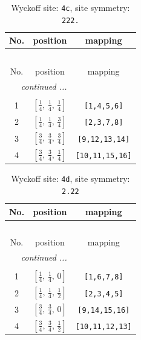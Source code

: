\documentclass[fleqn,8pt]{jsarticle}
\begin{document}
\renewcommand{\arraystretch}{1.2}
\begin{longtable}{ccc}
\caption{Wyckoff site: {\tt 4c}, site symmetry: {\tt 222.}}
 \\
 \hline \hline
No. & position & mapping \\ \hline \endfirsthead

\multicolumn{2}{l}{\tablename\ \thetable{}} \\
 \hline \hline
No. & position & mapping \\ \hline \endhead

 \hline \hline
\multicolumn{2}{r}{\footnotesize\it continued ...} \\ \endfoot

 \hline \hline
\multicolumn{2}{r}{} \\ \endlastfoot

1 & $\left[ \frac{1}{4},\, \frac{1}{4},\, \frac{1}{4} \right]$ & {\tt [1,4,5,6]} \\ \hline
2 & $\left[ \frac{1}{4},\, \frac{1}{4},\, \frac{3}{4} \right]$ & {\tt [2,3,7,8]} \\ \hline
3 & $\left[ \frac{3}{4},\, \frac{3}{4},\, \frac{3}{4} \right]$ & {\tt [9,12,13,14]} \\ \hline
4 & $\left[ \frac{3}{4},\, \frac{3}{4},\, \frac{1}{4} \right]$ & {\tt [10,11,15,16]} \\
\end{longtable}
\renewcommand{\arraystretch}{1.2}
\begin{longtable}{ccc}
\caption{Wyckoff site: {\tt 4d}, site symmetry: {\tt 2.22}}
 \\
 \hline \hline
No. & position & mapping \\ \hline \endfirsthead

\multicolumn{2}{l}{\tablename\ \thetable{}} \\
 \hline \hline
No. & position & mapping \\ \hline \endhead

 \hline \hline
\multicolumn{2}{r}{\footnotesize\it continued ...} \\ \endfoot

 \hline \hline
\multicolumn{2}{r}{} \\ \endlastfoot

1 & $\left[ \frac{1}{4},\, \frac{1}{4},\, 0 \right]$ & {\tt [1,6,7,8]} \\ \hline
2 & $\left[ \frac{1}{4},\, \frac{1}{4},\, \frac{1}{2} \right]$ & {\tt [2,3,4,5]} \\ \hline
3 & $\left[ \frac{3}{4},\, \frac{3}{4},\, 0 \right]$ & {\tt [9,14,15,16]} \\ \hline
4 & $\left[ \frac{3}{4},\, \frac{3}{4},\, \frac{1}{2} \right]$ & {\tt [10,11,12,13]} \\
\end{longtable}
\end{document}
